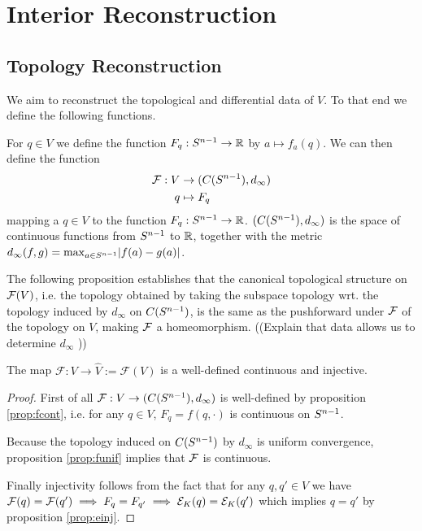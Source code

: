 \chapter{Interior Reconstruction}

\section{Topology Reconstruction}
We aim to reconstruct the topological and differential data of $V$. To that end we define the following functions.

For $q\in V$ we define the function $F_q:S^{n-1}\to\mathbb{R}$ by $a\mapsto f_a(q)$. We can then define the function 
\begin{align*}
    \mathcal{F}:V &\to (C(S^{n-1}),d_{\infty})\\
    q&\mapsto F_q
\end{align*} mapping a $q\in V$ to the function $F_q:S^{n-1}\to\mathbb{R}$. $(C(S^{n-1}),d_{\infty})$ is the space of continuous functions from $S^{n-1}$ to $\mathbb{R}$, together with the metric $d_\infty(f,g)=\max_{a\in S^{n-1}} \rvert f(a)-g(a) \lvert$.

The following proposition establishes that the canonical topological structure on $\mathcal{F}(V)$, i.e. the topology obtained by taking the subspace topology wrt. the topology induced by $d_\infty$ on $C(S^{n-1})$, is the same as the pushforward under $\mathcal{F}$ of the topology on $V$, making $\mathcal{F}$ a homeomorphism.
((Explain that data allows us to determine $d_\infty$ ))
\begin{lemma}\label{lem:Fprop}
The map $\mathcal{F}:V\to\widehat{V}:=\mathcal{F}(V)$ is a well-defined continuous and injective.
\end{lemma}
\begin{proof}
First of all $\mathcal{F}:V\to (C(S^{n-1}),d_\infty)$ is well-defined by proposition \ref{prop:fcont}, i.e. for any $q\in V$, $F_q=f(q,\cdot)$ is continuous on $S^{n-1}$.

Because the topology induced on $C(S^{n-1})$ by $d_\infty$ is uniform convergence, proposition \ref{prop:funif} implies that $\mathcal{F}$ is continuous.

Finally injectivity follows from the fact that for any $q,q'\in V$ we have $\mathcal{F}(q)=\mathcal{F}(q')\implies F_q = F_{q'} \implies {\mathcal{E}_K}(q) = {\mathcal{E}_K}(q')$ which implies $q = q'$ by proposition \ref{prop:einj}.
\end{proof}

